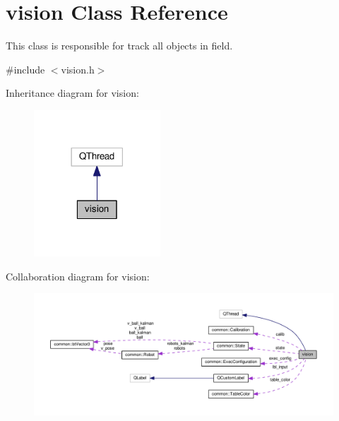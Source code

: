 \hypertarget{classvision}{\section{vision Class Reference}
\label{classvision}
}


This class is responsible for track all objects in field.  




{\ttfamily \#include $<$vision.\-h$>$}



Inheritance diagram for vision\-:
\nopagebreak
\begin{figure}[H]
\begin{center}
\leavevmode
\includegraphics[width=134pt]{classvision__inherit__graph}
\end{center}
\end{figure}


Collaboration diagram for vision\-:
\nopagebreak
\begin{figure}[H]
\begin{center}
\leavevmode
\includegraphics[width=350pt]{classvision__coll__graph}
\end{center}
\end{figure}
